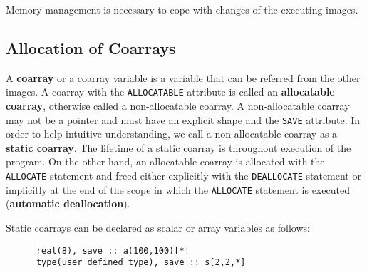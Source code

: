 

\requirement
Memory management is necessary to cope with changes of the executing images.



\subsection{Allocation of Coarrays}

A {\bf coarray} or a coarray variable is a variable that can be referred from the other images. 
A coarray with the {\tt ALLOCATABLE} attribute is called an {\bf allocatable coarray}, 
otherwise called a non-allocatable coarray. A non-allocatable coarray may not be a pointer 
and must have an explicit shape and the {\tt SAVE} attribute. 
In order to help intuitive understanding, we call a non-allocatable coarray as 
a {\bf static coarray}. The lifetime of a static coarray is throughout execution of the program. 
On the other hand, an allocatable coarray is allocated with the {\tt ALLOCATE} statement and 
freed either explicitly with the {\tt DEALLOCATE} statement or implicitly at the end of the scope
in which the {\tt ALLOCATE} statement is executed ({\bf automatic deallocation}).

Static coarrays can be declared as scalar or array variables as follows:
\begin{verbatim}
      real(8), save :: a(100,100)[*]
      type(user_defined_type), save :: s[2,2,*]
\end{verbatim}


